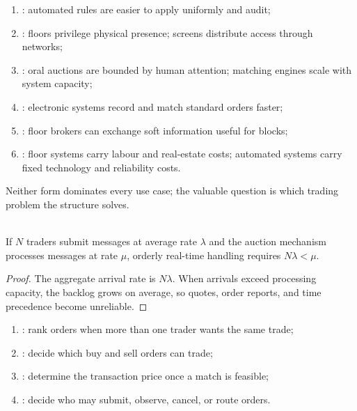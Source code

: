 \begin{taxonomy} 
\begin{enumerate}[label=\roman*.]
\setlength{\itemsep}{0pt}
\item {}: automated rules are easier to apply uniformly and audit;
\item {}: floors privilege physical presence; screens distribute access through networks;
\item {}: oral auctions are bounded by human attention; matching engines scale with system capacity;
\item {}: electronic systems record and match standard orders faster;
\item {}: floor brokers can exchange soft information useful for blocks;
\item {}: floor systems carry labour and real-estate costs; automated systems carry fixed technology and reliability costs.
\end{enumerate}
Neither form dominates every use case; the valuable question is which trading problem the structure solves.
\end{taxonomy}

\begin{proposition} \\
If $N$ traders submit messages at average rate $\lambda$ and the auction mechanism processes messages at rate $\mu$, orderly real-time handling requires $N\lambda<\mu$.
\begin{proof}
The aggregate arrival rate is $N\lambda$. When arrivals exceed processing capacity, the backlog grows on average, so quotes, order reports, and time precedence become unreliable.
\end{proof}
\end{proposition}

\begin{taxonomy} 
\begin{enumerate}[label=\roman*.]
\setlength{\itemsep}{0pt}
\item {}: rank orders when more than one trader wants the same trade;
\item {}: decide which buy and sell orders can trade;
\item {}: determine the transaction price once a match is feasible;
\item {}: decide who may submit, observe, cancel, or route orders.
\end{enumerate}
\end{taxonomy}


